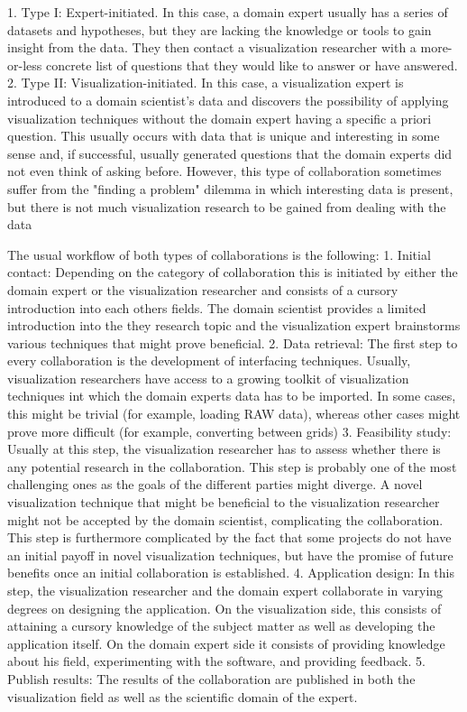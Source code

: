 1. Type I: Expert-initiated. In this case, a domain expert usually has a series of datasets and hypotheses, but they are lacking the knowledge or tools to gain insight from the data. They then contact a visualization researcher with a more-or-less concrete list of questions that they would like to answer or have answered.
2. Type II: Visualization-initiated. In this case, a visualization expert is introduced to a domain scientist's data and discovers the possibility of applying visualization techniques without the domain expert having a specific a priori question. This usually occurs with data that is unique and interesting in some sense and, if successful, usually generated questions that the domain experts did not even think of asking before. However, this type of collaboration sometimes suffer from the "finding a problem" dilemma in which interesting data is present, but there is not much visualization research to be gained from dealing with the data

The usual workflow of both types of collaborations is the following:
1. Initial contact: Depending on the category of collaboration this is initiated by either the domain expert or the visualization researcher and consists of a cursory introduction into each others fields. The domain scientist provides a limited introduction into the they research topic and the visualization expert brainstorms various techniques that might prove beneficial.
2. Data retrieval: The first step to every collaboration is the development of interfacing techniques. Usually, visualization researchers have access to a growing toolkit of visualization techniques int which the domain experts data has to be imported. In some cases, this might be trivial (for example, loading RAW data), whereas other cases might prove more difficult (for example, converting between grids)
3. Feasibility study: Usually at this step, the visualization researcher has to assess whether there is any potential research in the collaboration. This step is probably one of the most challenging ones as the goals of the different parties might diverge. A novel visualization technique that might be beneficial to the visualization researcher might not be accepted by the domain scientist, complicating the collaboration. This step is furthermore complicated by the fact that some projects do not have an initial payoff in novel visualization techniques, but have the promise of future benefits once an initial collaboration is established. 
4. Application design: In this step, the visualization researcher and the domain expert collaborate in varying degrees on designing the application. On the visualization side, this consists of attaining a cursory knowledge of the subject matter as well as developing the application itself. On the domain expert side it consists of providing knowledge about his field, experimenting with the software, and providing feedback.
5. Publish results: The results of the collaboration are published in both the visualization field as well as the scientific domain of the expert.


